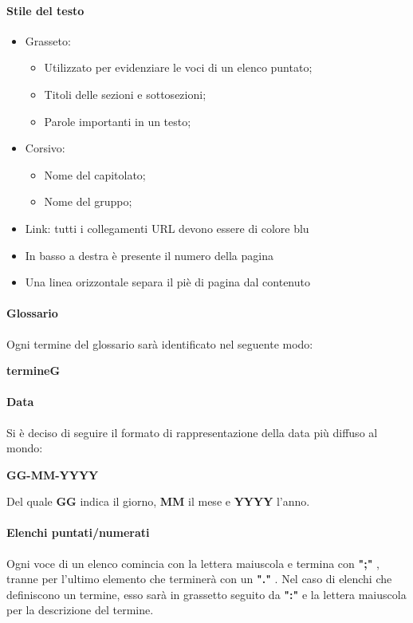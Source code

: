 \paragraph{Stile del testo}
\begin{itemize}
\item Grasseto:
\begin{itemize}
\item Utilizzato per evidenziare le voci di un elenco puntato;
\item Titoli delle sezioni e sottosezioni;
\item Parole importanti in un testo;
\end{itemize}
\item Corsivo:
\begin{itemize}
\item Nome del capitolato;
\item Nome del gruppo;
\end{itemize}
\item Link: tutti i collegamenti URL devono essere di colore blu
\item In basso a destra è presente il numero della pagina
\item Una linea orizzontale separa il piè di pagina dal contenuto

\end{itemize}

\paragraph*{Glossario}
Ogni termine del glossario sarà identificato nel seguente modo:
\begin{center}
\textbf{termineG}
\end{center}

\paragraph*{Data}

Si è deciso di seguire il formato di rappresentazione della data più diffuso al mondo:\\
\begin{center}
\textbf{GG-MM-YYYY}
\end{center}
Del quale \textbf{GG} indica il giorno, \textbf{MM} il mese e \textbf{YYYY} l'anno.

\paragraph*{Elenchi puntati/numerati}
Ogni voce di un elenco comincia con la lettera maiuscola e termina con \textbf{";"} , tranne per l'ultimo elemento che terminerà con un \textbf{"."} . 
Nel caso di elenchi che definiscono un termine, esso sarà in grassetto seguito da \textbf{":"} e la lettera maiuscola per la descrizione del termine.

